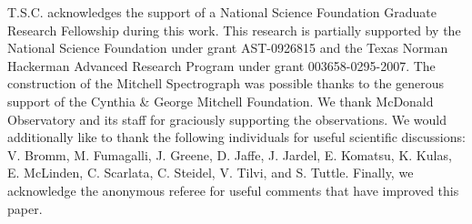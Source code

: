 \documentclass{emulateapj}
\begin{document}
T.S.C. acknowledges the support of a National Science Foundation Graduate Research Fellowship during this work. This research is partially supported by the National Science Foundation under grant AST-0926815 and the Texas Norman Hackerman Advanced Research Program under grant 003658-0295-2007. The construction of the Mitchell Spectrograph was possible thanks to the generous support of the Cynthia \& George Mitchell Foundation. We thank McDonald Observatory and its staff for graciously supporting the observations. We would additionally like to thank the following individuals for useful scientific discussions: V. Bromm, M. Fumagalli, J. Greene, D. Jaffe, J. Jardel, E. Komatsu, K. Kulas, E. McLinden, C. Scarlata, C. Steidel, V. Tilvi, and S. Tuttle. Finally, we acknowledge the anonymous referee for useful comments that have improved this paper. \\
\end{document}
